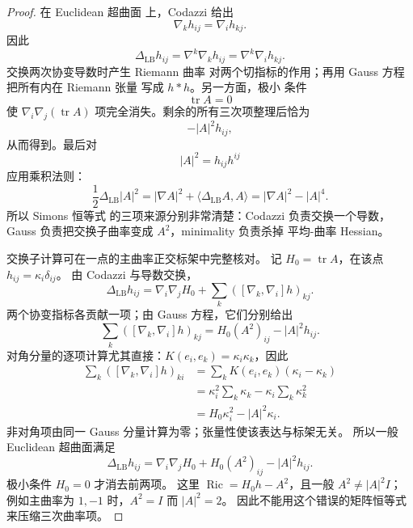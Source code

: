 \begin{proof}
在 Euclidean 超曲面 上，Codazzi 给出
\[
\nabla_k h_{ij}=\nabla_i h_{kj}.
\]
因此
\[
\Delta_{\mathrm{LB}}h_{ij}
=\nabla^k\nabla_kh_{ij}
=\nabla^k\nabla_i h_{kj}.
\]
交换两次协变导数时产生 Riemann 曲率 对两个切指标的作用；再用 Gauss 方程把所有内在 Riemann 张量 写成 $h*h$。另一方面，极小 条件
\[
\operatorname{tr}A=0
\]
使 $\nabla_i\nabla_j(\operatorname{tr}A)$ 项完全消失。剩余的所有三次项整理后恰为
\[
-|A|^2h_{ij},
\]
从而得到。最后对
\[
|A|^2=h_{ij}h^{ij}
\]
应用乘积法则：
\[
\frac12\Delta_{\mathrm{LB}}|A|^2
=|\nabla A|^2
+\langle\Delta_{\mathrm{LB}}A,A\rangle
=|\nabla A|^2-|A|^4.
\]
所以 Simons 恒等式 的三项来源分别非常清楚：Codazzi 负责交换一个导数，Gauss 负责把交换子曲率变成 $A^2$，minimality 负责杀掉 平均-曲率 Hessian。

交换子计算可在一点的主曲率正交标架中完整核对。
记 $H_0=\operatorname{tr}A$，在该点 $h_{ij}=\kappa_i\delta_{ij}$。
由 Codazzi 与导数交换，
\[
\Delta_{\mathrm{LB}}h_{ij}
=\nabla_i\nabla_jH_0+
\sum_k([\nabla_k,\nabla_i]h)_{kj}.
\]
两个协变指标各贡献一项；由 Gauss 方程，它们分别给出
\[
\sum_k([\nabla_k,\nabla_i]h)_{kj}
=H_0(A^2)_{ij}-|A|^2h_{ij}.
\]
对角分量的逐项计算尤其直接：$K(e_i,e_k)=\kappa_i\kappa_k$，因此
\[
\begin{aligned}
\sum_k([\nabla_k,\nabla_i]h)_{ki}
&=\sum_kK(e_i,e_k)(\kappa_i-\kappa_k)\\
&=\kappa_i^2\sum_k\kappa_k-\kappa_i\sum_k\kappa_k^2\\
&=H_0\kappa_i^2-|A|^2\kappa_i.
\end{aligned}
\]
非对角项由同一 Gauss 分量计算为零；张量性使该表达与标架无关。
所以一般 Euclidean 超曲面满足
\[
\Delta_{\mathrm{LB}}h_{ij}
=\nabla_i\nabla_jH_0+H_0(A^2)_{ij}-|A|^2h_{ij}.
\]
极小条件 $H_0=0$ 才消去前两项。
这里 $\operatorname{Ric}=H_0h-A^2$，且一般 $A^2\ne|A|^2I$；
例如主曲率为 $1,-1$ 时，$A^2=I$ 而 $|A|^2=2$。
因此不能用这个错误的矩阵恒等式来压缩三次曲率项。
\end{proof}
